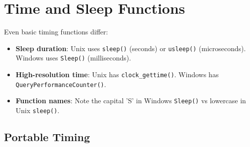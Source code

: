 \section{Time and Sleep Functions}

Even basic timing functions differ:

\begin{itemize}
    \item \textbf{Sleep duration}: Unix uses \texttt{sleep()} (seconds) or \texttt{usleep()} (microseconds). Windows uses \texttt{Sleep()} (milliseconds).
    \item \textbf{High-resolution time}: Unix has \texttt{clock\_gettime()}. Windows has \texttt{QueryPerformanceCounter()}.
    \item \textbf{Function names}: Note the capital 'S' in Windows \texttt{Sleep()} vs lowercase in Unix \texttt{sleep()}.
\end{itemize}

\subsection{Portable Timing}

